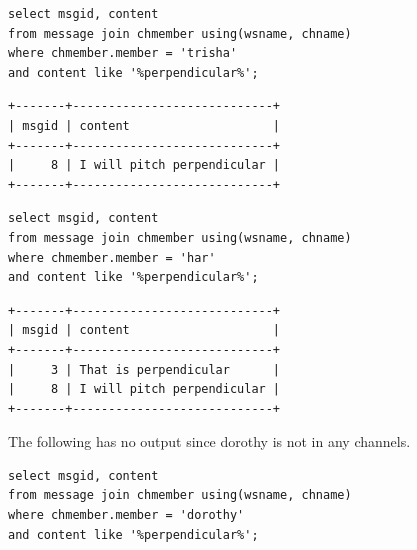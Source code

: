 \documentclass{article}
\begin{document}
\begin{enumerate}
\begin{lstlisting}
select msgid, content
from message join chmember using(wsname, chname)
where chmember.member = 'trisha'
and content like '%perpendicular%';
\end{lstlisting}
\begin{verbatim}
+-------+----------------------------+
| msgid | content                    |
+-------+----------------------------+
|     8 | I will pitch perpendicular |
+-------+----------------------------+
\end{verbatim}

\begin{lstlisting}
select msgid, content
from message join chmember using(wsname, chname)
where chmember.member = 'har'
and content like '%perpendicular%';
\end{lstlisting}
\begin{verbatim}
+-------+----------------------------+
| msgid | content                    |
+-------+----------------------------+
|     3 | That is perpendicular      |
|     8 | I will pitch perpendicular |
+-------+----------------------------+
\end{verbatim}

The following has no output since dorothy is not in any channels.
\begin{lstlisting}
select msgid, content
from message join chmember using(wsname, chname)
where chmember.member = 'dorothy'
and content like '%perpendicular%';
\end{lstlisting}

\end{enumerate}
\end{document}
